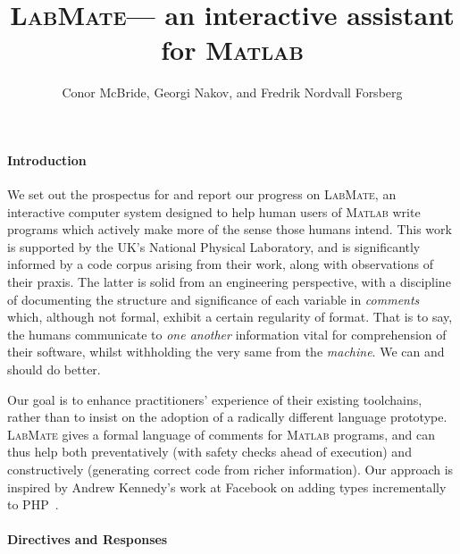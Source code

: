 \documentclass{ws-procs9x6}
\newcommand{\lr}{\textsc{LabMate}}
\newcommand{\ma}{\textsc{Matlab}}
\newcommand{\remph}{\emph}
\begin{document}
\title{\lr --- an interactive assistant for \ma}
\author{Conor McBride, Georgi Nakov, and Fredrik Nordvall Forsberg}
\address{University of Strathclyde}

\bodymatter

\paragraph{Introduction}

We set out the prospectus for and report our progress on \lr, an interactive computer system designed to help human users of \ma{} write programs which actively make more of the sense those humans intend. This work is supported by the UK's National Physical Laboratory, and is significantly informed by a code corpus arising from their work, along with observations of their praxis. The latter is solid from an engineering perspective, with a discipline of documenting the structure and significance of each variable in \remph{comments} which, although not formal, exhibit a certain regularity of format. That is to say, the humans communicate to \remph{one another} information vital for comprehension of their software, whilst withholding the very same from the \remph{machine}. We can and should do better.


Our goal is to enhance practitioners' experience of their existing toolchains, rather than to insist on the adoption of a radically different language prototype. \lr{} gives a formal language of comments for \ma{} programs, and can thus help both preventatively (with safety checks ahead of execution) and constructively (generating correct code from richer information). Our approach is inspired by Andrew Kennedy's work at Facebook on adding types incrementally to PHP~\cite{hack}.

\paragraph{Directives and Responses}
\end{document}
